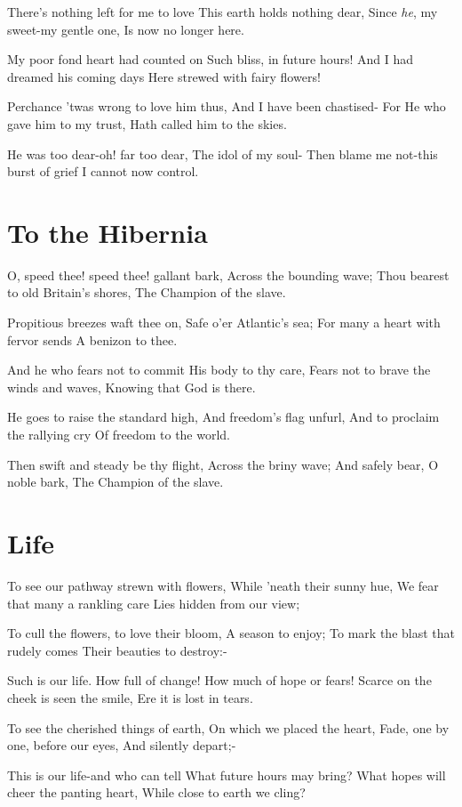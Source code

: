 \documentclass[11pt,a4paper]{article}
\begin{document}
There's nothing left for me to love
This earth holds nothing dear,
Since \textit{he}, my sweet-my gentle one,
Is now no longer here.

My poor fond heart had counted on
Such bliss, in future hours!
And I had dreamed his coming days
Here strewed with fairy flowers!

Perchance 'twas wrong to love him thus,
And I have been chastised-
For He who gave him to my trust,
Hath called him to the skies.

He was too dear-oh! far too dear,
The idol of my soul-
Then blame me not-this burst of grief
I cannot now control.

\section{To the Hibernia}

O, speed thee! speed thee! gallant bark,
Across the bounding wave;
Thou bearest to old Britain's shores,
The Champion of the slave.

Propitious breezes waft thee on,
Safe o'er Atlantic's sea;
For many a heart with fervor sends
A benizon to thee.

And he who fears not to commit
His body to thy care,
Fears not to brave the winds and waves,
Knowing that God is there.

He goes to raise the standard high,
And freedom's flag unfurl,
And to proclaim the rallying cry
Of freedom to the world.

Then swift and steady be thy flight,
Across the briny wave;
And safely bear, O noble bark,
The Champion of the slave.

\section{Life}

To see our pathway strewn with flowers,
While 'neath their sunny hue,
We fear that many a rankling care
Lies hidden from our view;

To cull the flowers, to love their bloom,
A season to enjoy;
To mark the blast that rudely comes
Their beauties to destroy:-

Such is our life. How full of change!
How much of hope or fears!
Scarce on the cheek is seen the smile,
Ere it is lost in tears.

To see the cherished things of earth,
On which we placed the heart,
Fade, one by one, before our eyes,
And silently depart;-

This is our life-and who can tell
What future hours may bring?
What hopes will cheer the panting heart,
While close to earth we cling?
\end{document}
